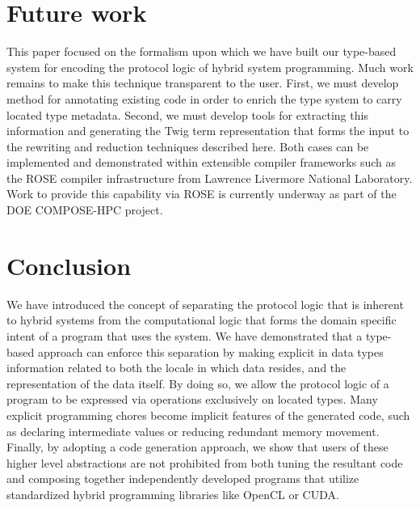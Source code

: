 
\section{Future work}

This paper focused on the formalism upon which we have built our type-based system for encoding the protocol logic of hybrid system programming. Much work remains to make this technique transparent to the user. First, we must develop method for annotating existing code in order to enrich the type system to carry located type metadata. Second, we must develop tools for extracting this information and generating the Twig term representation that forms the input to the rewriting and reduction techniques described here. Both cases can be implemented and demonstrated within extensible compiler frameworks such as the ROSE compiler infrastructure from Lawrence Livermore National Laboratory. Work to provide this capability via ROSE is currently underway as part of the DOE COMPOSE-HPC project.

\section{Conclusion}

We have introduced the concept of separating the protocol logic that is inherent to hybrid systems from the computational logic that forms the domain specific intent of a program that uses the system. We have demonstrated that a type-based approach can enforce this separation by making explicit in data types information related to both the locale in which data resides, and the representation of the data itself. By doing so, we allow the protocol logic of a program to be expressed via operations exclusively on located types. Many explicit programming chores become implicit features of the generated code, such as declaring intermediate values or reducing redundant memory movement. Finally, by adopting a code generation approach, we show that users of these higher level abstractions are not prohibited from both tuning the resultant code and composing together independently developed programs that utilize standardized hybrid programming libraries like OpenCL or CUDA.

